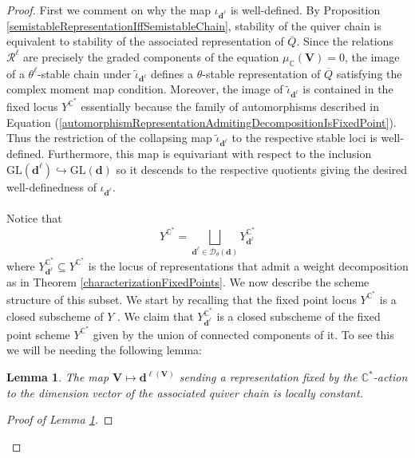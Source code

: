 \documentclass{amsart}
\theoremstyle{plain}
\newtheorem{lemma}[theorem]{Lemma}
\numberwithin{equation}{section}
\theoremstyle{definition}
\theoremstyle{remark}
\begin{document}
	\begin{proof}
		First we comment on why the map $\iota_{\mathbf{d}^\ell}$ is well-defined. By Proposition
		\ref{semistableRepresentationIffSemistableChain}, stability of the quiver chain is
		equivalent to stability of the associated representation of \(\overline Q\). Since the relations
		$\mathcal R^\ell$ are precisely the graded components of the equation $\mu_{\mathbb C}(\mathbf{V})=0$, the image of a $\theta^\ell$-stable chain under $\tilde{\iota}_{\mathbf{d}^\ell}$ defines a $\theta$-stable representation of $\overline Q$ satisfying the complex moment map condition. Moreover, the image of $\tilde{\iota}_{\mathbf{d}^\ell}$ is contained in the fixed locus $Y^{\mathbb{C}^*}$ essentially because the family of automorphisms described in Equation (\ref{automorphismRepresentationAdmitingDecompositionIsFixedPoint}). Thus the restriction of the collapsing map $\tilde{\iota}_{\mathbf{d}^\ell}$ to the respective stable loci is well-defined. Furthermore, this map is equivariant with respect to the inclusion $\text{GL}(\mathbf{d}^\ell)\hookrightarrow\text{GL}(\mathbf{d})$ so it descends to the respective quotients giving the desired well-definedness of $\iota_{\mathbf{d}^\ell}$.
		\\
		\\
		Notice that 
		$$
		Y^{\mathbb{C}^*}=\bigsqcup_{\mathbf{d}^\ell\in \mathscr{D}_{\theta}(\mathbf{d})} Y^{\mathbb{C}^*}_{\mathbf{d}^\ell}
		$$
		where $Y_{\mathbf{d}^\ell}^{\mathbb{C}^*}\subseteq Y^{\mathbb{C}^*}$ is the locus of representations that admit a weight decomposition as in Theorem \ref{characterizationFixedPoints}. We now describe the scheme structure of this subset. We start by recalling that the fixed point locus $Y^{\mathbb{C}^*}$ is a closed subscheme of $Y$ \cite[Theorem 7.1]{MilneAlgebraicGroups}. We claim that $Y^{\mathbb{C}^*}_{\mathbf{d}^\ell}$ is a closed subscheme of the fixed point scheme $Y^{\mathbb{C}^*}$ given by the union of connected components of it. To see this we will be needing the following lemma:
		\begin{lemma}\label{weightDecompositionDimensionIsLocallyConstant}
			The map $\mathbf{V}\mapsto \mathbf{d}^{\ell(\mathbf{V})}$ sending a representation fixed by the $\mathbb{C}^*$-action to the dimension vector of the associated quiver chain is locally constant. 
		\end{lemma} 
		\begin{proof}[Proof of Lemma \ref{weightDecompositionDimensionIsLocallyConstant}]

\end{proof}
\end{proof}
\end{document}
